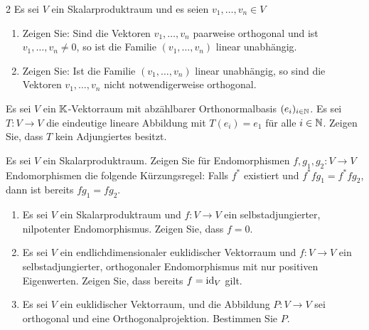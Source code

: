 

\begin{question}[subtitle = Orthogonalität und lineare Unabhängigkeit von Vektoren]{2}
  Es sei $V$ ein Skalarproduktraum und es seien $v_1, \dotsc, v_n \in V$
  \begin{enumerate}[leftmargin=*]
    \item
      Zeigen Sie:
      Sind die Vektoren $v_1, \dotsc, v_n$ paarweise orthogonal und ist $v_1, \dotsc, v_n \neq 0$, so ist die Familie $(v_1, \dotsc, v_n)$ linear unabhängig.
    \item
      Zeigen Sie:
      Ist die Familie $(v_1, \dotsc, v_n)$ linear unabhängig, so sind die Vektoren $v_1, \dotsc, v_n$ nicht notwendigerweise orthogonal.
  \end{enumerate}
\end{question}


\begin{question}[subtitle = Ein Gegenbeispiel]{2}
  Es sei $V$ ein $\mathbb{K}$-Vektorraum mit abzählbarer Orthonormalbasis $(e_i)_{i \in \mathbb{N}}$.
  Es sei $T \colon V \to V$ die eindeutige lineare Abbildung mit $T(e_i) = e_1$ für alle $i \in \mathbb{N}$.
  Zeigen Sie, dass $T$ kein Adjungiertes besitzt.
\end{question}


\begin{question}[subtitle = Eine Kürzungsregel]{2}
  Es sei $V$ ein Skalarproduktraum.
  Zeigen Sie für Endomorphismen $f, g_1, g_2 \colon V \to V$ Endomorphismen die folgende Kürzungsregel:
  Falls $f^*$ existiert und $f^* f g_1 = f^* f g_2$, dann ist bereits $f g_1 = f g_2$.
\end{question}


\begin{question}[subtitle = Bestimmung von Abbildungen]{2}
  \begin{enumerate}
    \item
      Es sei $V$ ein Skalarproduktraum und $f \colon V \to V$ ein selbstadjungierter, nilpotenter Endomorphismus.
      Zeigen Sie, dass $f = 0$.
    \item
      Es sei $V$ ein endlichdimensionaler euklidischer Vektorraum und $f \colon V \to V$ ein selbstadjungierter, orthogonaler Endomorphismus mit nur positiven Eigenwerten.
      Zeigen Sie, dass bereits $f = \operatorname{id}_V$ gilt.
    \item
      Es sei $V$ ein euklidischer Vektorraum, und die Abbildung $P \colon V \to V$ sei orthogonal und eine Orthogonalprojektion.
      Bestimmen Sie $P$.
  \end{enumerate}
\end{question}


